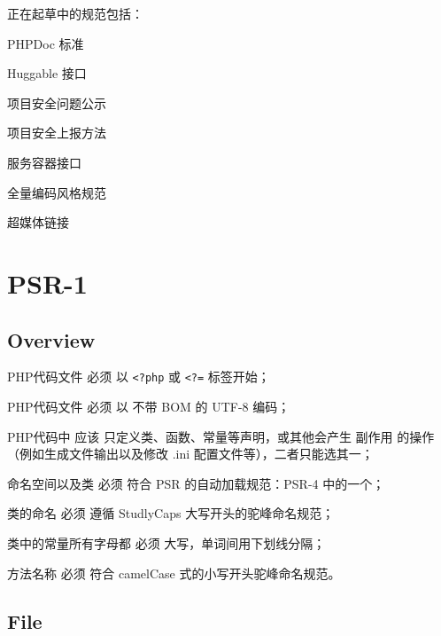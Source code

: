 正在起草中的规范包括：

\begin{compactitem}
\item PHPDoc 标准
\item Huggable 接口
\item 项目安全问题公示
\item 项目安全上报方法
\item 服务容器接口
\item 全量编码风格规范
\item 超媒体链接
\end{compactitem}


\chapter{PSR-1}


\section{Overview}

\begin{compactitem}
\item PHP代码文件 必须 以 \texttt{<?php} 或 \texttt{<?=} 标签开始；

\item PHP代码文件 必须 以 不带 BOM 的 UTF-8 编码；

\item PHP代码中 应该 只定义类、函数、常量等声明，或其他会产生 副作用 的操作（例如生成文件输出以及修改 .ini 配置文件等），二者只能选其一；

\item 命名空间以及类 必须 符合 PSR 的自动加载规范：PSR-4 中的一个；

\item 类的命名 必须 遵循 StudlyCaps 大写开头的驼峰命名规范；

\item 类中的常量所有字母都 必须 大写，单词间用下划线分隔；

\item 方法名称 必须 符合 camelCase 式的小写开头驼峰命名规范。

\end{compactitem}





\section{File}

